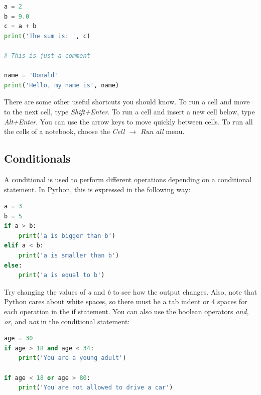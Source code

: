 \documentclass[a4paper , 12pt]{book}
\begin{document}
\begin{center}
\begin{lstlisting}[language=Python, frame=single]
a = 2 
b = 9.0 
c = a + b 
print('The sum is: ', c) 
 	
# This is just a comment 
	
name = 'Donald' 
print('Hello, my name is', name)
\end{lstlisting}
\end{center}

There are some other useful shortcuts you should know. To run a cell and move to the next cell, type \textit{Shift+Enter}. To run a cell and insert a new cell below, type \textit{Alt+Enter}. You can use the arrow keys to move quickly between cells. To run all the cells of a notebook, choose the \textit{Cell $\rightarrow$ Run all} menu.

\subsection{Conditionals}

A conditional is used to perform different operations depending on a conditional statement. In Python, this is expressed in the following way:

\begin{center}
\begin{lstlisting}[language=Python, frame=single]
a = 3
b = 5
if a > b:
    print('a is bigger than b')
elif a < b:    
    print('a is smaller than b')
else:
    print('a is equal to b')
\end{lstlisting}
\end{center}

Try changing the values of \textit{a} and \textit{b} to see how the output changes. Also, note that Python cares about white spaces, so there must be a tab indent or 4 spaces for each operation in the if statement. You can also use the boolean operators \textit{and}, \textit{or}, and \textit{not} in the conditional statement:

\begin{center}
\begin{lstlisting}[language=Python, frame=single]
age = 30
if age > 18 and age < 34:
    print('You are a young adult')

if age < 18 or age > 80:
    print('You are not allowed to drive a car')
\end{lstlisting}
\end{center}
\end{document}
